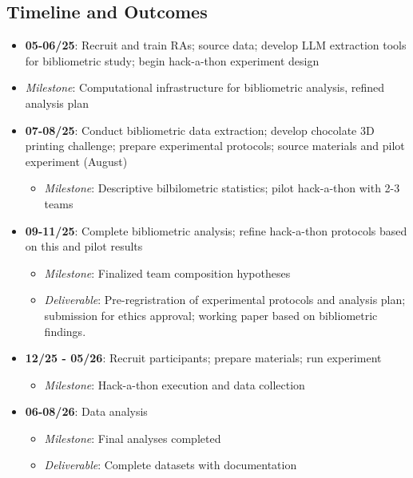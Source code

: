 \documentclass{article}
\begin{document}
\subsection{Timeline and Outcomes}
\begin{description}
\begin{itemize}
\item \textbf{05-06/25}: Recruit and train RAs; source data; develop LLM extraction tools for bibliometric study; begin hack-a-thon experiment design
\item \textit{Milestone}: Computational infrastructure for bibliometric analysis, refined analysis plan

\item \textbf{07-08/25}: Conduct bibliometric data extraction; develop chocolate 3D printing challenge; prepare experimental protocols; source materials and pilot experiment (August)
  \begin{itemize}
  \item \textit{Milestone}: Descriptive bilbilometric statistics; pilot hack-a-thon with 2-3 teams
  \end{itemize}

\item \textbf{09-11/25}: Complete bibliometric analysis; refine hack-a-thon protocols based on this and pilot results
  \begin{itemize}
  \item \textit{Milestone}: Finalized team composition hypotheses
  \item \textit{Deliverable}: Pre-regristration of experimental protocols and analysis plan; submission for ethics approval; working paper based on bibliometric findings.
  \end{itemize}

\item \textbf{12/25 - 05/26}: Recruit participants; prepare materials; run experiment
  \begin{itemize}
  \item \textit{Milestone}: Hack-a-thon execution and data collection
  \end{itemize}
  
\item \textbf{06-08/26}: Data analysis
  \begin{itemize}
  \item \textit{Milestone}: Final analyses completed
  \item \textit{Deliverable}: Complete datasets with documentation
  \end{itemize}


\end{itemize}
\end{description}
\end{document}
